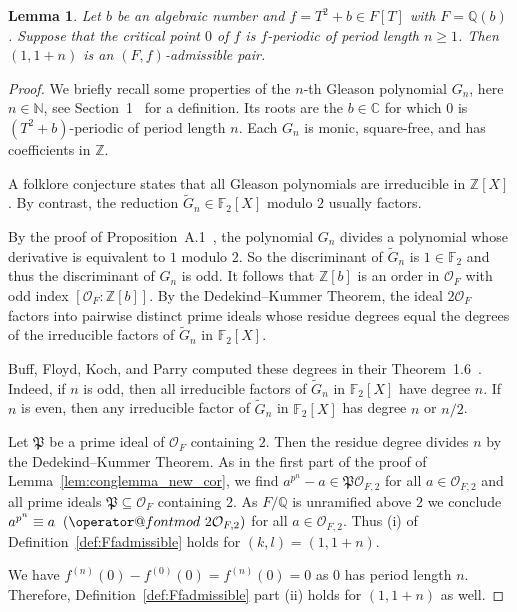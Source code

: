 \documentclass[12pt,oneside,a4]{amsart}
\makeatletter
\newcommand{\IC}{\mathbb{C}}
\newcommand{\IN}{\mathbb{N}}
\newcommand{\IQ}{\mathbb{Q}}
\newcommand{\IZ}{\mathbb{Z}}
\newcommand{\IF}{\mathbb{F}}
\newcommand{\cO}{\mathcal{O}}
\newcounter{maincounter}
\numberwithin{maincounter}{section}
\numberwithin{equation}{section}
\newtheorem{lemma}[maincounter]{Lemma}
\renewcommand{\subset}{\subseteq}
\def\imod#1{\allowbreak\mkern10mu({\operator@font mod}\,\,#1)}
\makeatother
\begin{document}
\begin{lemma}
  \label{lem:conglemma_unicritical}
  Let $b$ be an algebraic number and $f=T^2+b\in F[T]$ with $F=\IQ(b)$.
  Suppose that the
  critical point $0$ of $f$ is $f$-periodic of period length $n\ge 1$.
  Then $(1,1+n)$ is an $(F,f)$-admissible pair.
\end{lemma}
\begin{proof}
  We briefly recall some properties of the $n$-th Gleason polynomial
  $G_n$, here $n\in\IN$, 
  see Section~1~\cite{BFKP:Gleason} for a definition.
   Its roots 
  are the  $b\in\IC$ for
  which $0$ is $(T^2+b)$-periodic of period length $n$.
  Each $G_n$ is monic, square-free, and has coefficients in $\IZ$.


  A folklore conjecture states that all Gleason polynomials are
  irreducible in $\IZ[X]$. By contrast, the reduction
  $\tilde{G}_n\in \IF_2[X]$ modulo $2$ usually factors.
  
  By the proof of Proposition~A.1~\cite{epstein:12}, the polynomial
  $G_n$ divides a polynomial whose derivative is equivalent to $1$
  modulo $2$. So the discriminant of $\tilde{G}_n$ is  $1\in \IF_2$
  and thus the discriminant of $G_n$ is odd. 
  It follows that  $\IZ[b]$ is an order in $\mathcal{O}_{F}$ with odd index
  $[\mathcal{O}_F : \IZ[b]]$. By the Dedekind--Kummer Theorem, the ideal
  $2\mathcal{O}_F$ factors into pairwise distinct prime ideals whose
  residue degrees equal the degrees of the irreducible factors of
  $\tilde{G}_n$ in $\IF_2[X]$. 
  

  Buff, Floyd, Koch, and Parry computed these degrees  in their
  Theorem~1.6~\cite{BFKP:Gleason}. Indeed, if $n$ is odd, then all
  irreducible factors of $\tilde{G}_n$ in $\IF_2[X]$ have degree
  $n$. If $n$ is even, then any irreducible factor of $\tilde{G}_n$
  in $\IF_2[X]$ has degree $n$ or $n/2$.

  Let $\mathfrak{P}$ be a prime ideal of $\cO_F$ containing $2$.
  Then the residue degree divides
  $n$ by the Dedekind--Kummer Theorem.
  As in the first part of the proof of
  Lemma~\ref{lem:conglemma_new_cor},
  we find
  $a^{p^n} - a \in \mathfrak{P}  \mathcal{O}_{F,2}$ for all $a\in
  \mathcal{O}_{F,2}$
  and all
  prime ideals  $\mathfrak{P}\subset \cO_F$ containing $2$.
  As $F/\IQ$ is unramified above $2$ we conclude
  $a^{p^n} \equiv  a \imod{2\mathcal{O}_{F,2}}$ for all $a\in
  \mathcal{O}_{F,2}$.
  Thus (i) of Definition~\ref{def:Ffadmissible}
  holds for $(k,l)=(1,1+n)$.

  We have $f^{(n)}(0) - f^{(0)}(0) = f^{(n)}(0) = 0$ as $0$ has period
  length $n$. Therefore, Definition~\ref{def:Ffadmissible} part (ii)
  holds
  for $(1,1+n)$ as well.
\end{proof}
\end{document}
